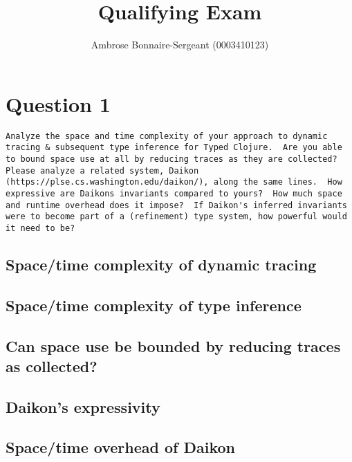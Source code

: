 \documentclass[10pt]{article}
\begin{document}
\title{Qualifying Exam}
\author{Ambrose Bonnaire-Sergeant (0003410123)}

\maketitle


\section*{Question 1}

\begin{verbatim}
Analyze the space and time complexity of your approach to dynamic
tracing & subsequent type inference for Typed Clojure.  Are you able
to bound space use at all by reducing traces as they are collected?
Please analyze a related system, Daikon
(https://plse.cs.washington.edu/daikon/), along the same lines.  How
expressive are Daikons invariants compared to yours?  How much space
and runtime overhead does it impose?  If Daikon's inferred invariants
were to become part of a (refinement) type system, how powerful would
it need to be?
\end{verbatim}

\subsection*{Space/time complexity of dynamic tracing}

\subsection*{Space/time complexity of type inference}

\subsection*{Can space use be bounded by reducing traces as collected?}

\subsection*{Daikon's expressivity}

\subsection*{Space/time overhead of Daikon}
\end{document}
